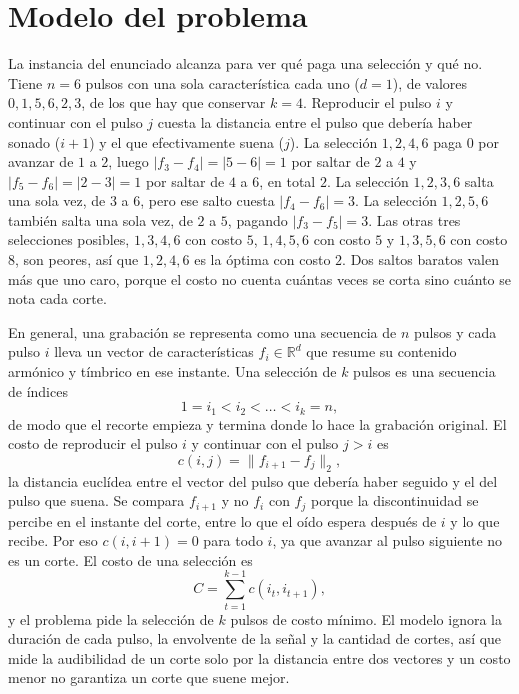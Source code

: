 \section{Modelo del problema}
\label{sec:modelo}

La instancia del enunciado alcanza para ver qué paga una selección y qué no. Tiene $n = 6$ pulsos con una sola característica cada uno ($d = 1$), de valores $0, 1, 5, 6, 2, 3$, de los que hay que conservar $k = 4$. Reproducir el pulso $i$ y continuar con el pulso $j$ cuesta la distancia entre el pulso que debería haber sonado ($i+1$) y el que efectivamente suena ($j$). La selección $1, 2, 4, 6$ paga $0$ por avanzar de $1$ a $2$, luego $|f_3 - f_4| = |5 - 6| = 1$ por saltar de $2$ a $4$ y $|f_5 - f_6| = |2 - 3| = 1$ por saltar de $4$ a $6$, en total $2$. La selección $1, 2, 3, 6$ salta una sola vez, de $3$ a $6$, pero ese salto cuesta $|f_4 - f_6| = 3$. La selección $1, 2, 5, 6$ también salta una sola vez, de $2$ a $5$, pagando $|f_3 - f_5| = 3$. Las otras tres selecciones posibles, $1, 3, 4, 6$ con costo $5$, $1, 4, 5, 6$ con costo $5$ y $1, 3, 5, 6$ con costo $8$, son peores, así que $1, 2, 4, 6$ es la óptima con costo $2$. Dos saltos baratos valen más que uno caro, porque el costo no cuenta cuántas veces se corta sino cuánto se nota cada corte.

En general, una grabación se representa como una secuencia de $n$ pulsos y cada pulso $i$ lleva un vector de características $f_i \in \mathbb{R}^d$ que resume su contenido armónico y tímbrico en ese instante. Una selección de $k$ pulsos es una secuencia de índices
\[
1 = i_1 < i_2 < \dots < i_k = n,
\]
de modo que el recorte empieza y termina donde lo hace la grabación original. El costo de reproducir el pulso $i$ y continuar con el pulso $j > i$ es
\[
c(i, j) = \lVert f_{i+1} - f_j \rVert_2,
\]
la distancia euclídea entre el vector del pulso que debería haber seguido y el del pulso que suena. Se compara $f_{i+1}$ y no $f_i$ con $f_j$ porque la discontinuidad se percibe en el instante del corte, entre lo que el oído espera después de $i$ y lo que recibe. Por eso $c(i, i+1) = 0$ para todo $i$, ya que avanzar al pulso siguiente no es un corte. El costo de una selección es
\[
C = \sum_{t=1}^{k-1} c(i_t, i_{t+1}),
\]
y el problema pide la selección de $k$ pulsos de costo mínimo. El modelo ignora la duración de cada pulso, la envolvente de la señal y la cantidad de cortes, así que mide la audibilidad de un corte solo por la distancia entre dos vectores y un costo menor no garantiza un corte que suene mejor.

